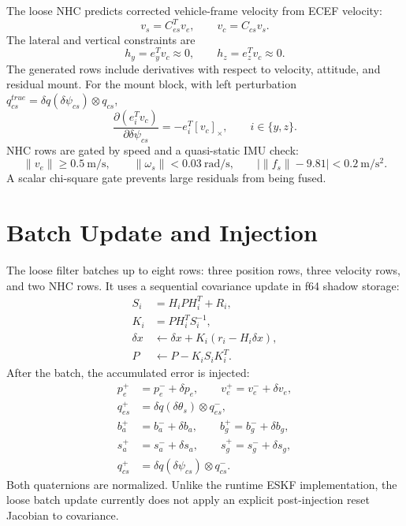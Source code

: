 \documentclass[11pt]{article}
\newcommand{\T}{^{T}}
\newcommand{\crossmat}[1]{\left[#1\right]_\times}
\newcommand{\dq}{\delta q}
\begin{document}
The loose NHC predicts corrected vehicle-frame velocity from ECEF velocity:
\begin{equation}
  v_s=C_{es}\T v_e,\qquad v_c=C_{cs}v_s .
\end{equation}
The lateral and vertical constraints are
\begin{equation}
  h_y=e_y\T v_c\approx 0,\qquad
  h_z=e_z\T v_c\approx 0 .
\end{equation}
The generated rows include derivatives with respect to velocity, attitude, and
residual mount. For the mount block, with left perturbation
\(q_{cs}^{true}=\dq(\delta\psi_{cs})\otimes q_{cs}\),
\begin{equation}
  \frac{\partial(e_i\T v_c)}{\partial\delta\psi_{cs}}
  =-e_i\T\crossmat{v_c},\qquad i\in\{y,z\}.
\end{equation}
NHC rows are gated by speed and a quasi-static IMU check:
\begin{equation}
  \|v_e\| \ge 0.5\ \mathrm{m/s},\qquad
  \|\omega_s\|<0.03\ \mathrm{rad/s},\qquad
  \left|\|f_s\|-9.81\right|<0.2\ \mathrm{m/s^2}.
\end{equation}
A scalar chi-square gate prevents large residuals from being fused.

\section{Batch Update and Injection}

The loose filter batches up to eight rows: three position rows, three velocity
rows, and two NHC rows. It uses a sequential covariance update in f64 shadow
storage:
\begin{align}
  S_i &= H_iPH_i\T+R_i,\\
  K_i &= PH_i\T S_i^{-1},\\
  \delta x &\leftarrow \delta x + K_i(r_i-H_i\delta x),\\
  P &\leftarrow P-K_iS_iK_i\T .
\end{align}
After the batch, the accumulated error is injected:
\begin{align}
  p_e^{+}&=p_e^{-}+\delta p_e,\qquad
  v_e^{+}=v_e^{-}+\delta v_e,\\
  q_{es}^{+}&=\dq(\delta\theta_s)\otimes q_{es}^{-},\\
  b_a^{+}&=b_a^{-}+\delta b_a,\qquad
  b_g^{+}=b_g^{-}+\delta b_g,\\
  s_a^{+}&=s_a^{-}+\delta s_a,\qquad
  s_g^{+}=s_g^{-}+\delta s_g,\\
  q_{cs}^{+}&=\dq(\delta\psi_{cs})\otimes q_{cs}^{-}.
\end{align}
Both quaternions are normalized. Unlike the runtime ESKF implementation, the
loose batch update currently does not apply an explicit post-injection reset
Jacobian to covariance.
\end{document}
